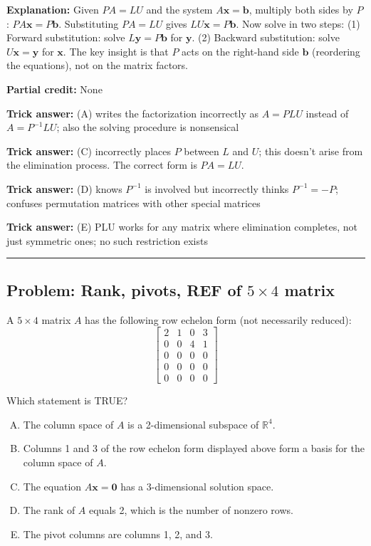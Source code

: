 \documentclass[12pt]{amsart}
\newcommand{\divider}{
  \vspace{-1em}
  \noindent
  \raisebox{-0.15ex}{\textbullet}%
  \hspace{0.5em}%
  \rule[0.5ex]{0.95\textwidth}{1.0pt}%
  \hspace{0.5em}%
  \raisebox{-0.15ex}{\textbullet}%
  \vspace{0em}
}
\begin{document}
\textbf{Explanation:} Given $PA = LU$ and the system $A\mathbf{x} = \mathbf{b}$, multiply both sides by $P$: $PA\mathbf{x} = P\mathbf{b}$. Substituting $PA = LU$ gives $LU\mathbf{x} = P\mathbf{b}$. Now solve in two steps: (1) Forward substitution: solve $L\mathbf{y} = P\mathbf{b}$ for $\mathbf{y}$. (2) Backward substitution: solve $U\mathbf{x} = \mathbf{y}$ for $\mathbf{x}$. The key insight is that $P$ acts on the right-hand side $\mathbf{b}$ (reordering the equations), not on the matrix factors.

\textbf{Partial credit:} None

\textbf{Trick answer:} (A) writes the factorization incorrectly as $A = PLU$ instead of $A = P^{-1}LU$; also the solving procedure is nonsensical

\textbf{Trick answer:} (C) incorrectly places $P$ between $L$ and $U$; this doesn't arise from the elimination process. The correct form is $PA = LU$.

\textbf{Trick answer:} (D) knows $P^{-1}$ is involved but incorrectly thinks $P^{-1} = -P$; confuses permutation matrices with other special matrices

\textbf{Trick answer:} (E) PLU works for any matrix where elimination completes, not just symmetric ones; no such restriction exists

\divider

\subsection*{Problem: Rank, pivots, REF of $5 \times 4$ matrix}

A $5 \times 4$ matrix $A$ has the following row echelon form (not necessarily reduced):
$$\begin{bmatrix} 2 & 1 & 0 & 3 \\ 0 & 0 & 4 & 1 \\ 0 & 0 & 0 & 0 \\ 0 & 0 & 0 & 0 \\ 0 & 0 & 0 & 0 \end{bmatrix}$$

Which statement is TRUE?

\begin{enumerate}[(A)]
\item The column space of $A$ is a 2-dimensional subspace of $\mathbb{R}^4$.
\item Columns 1 and 3 of the row echelon form displayed above form a basis for the column space of $A$.
\item The equation $A\mathbf{x} = \mathbf{0}$ has a 3-dimensional solution space.
\item The rank of $A$ equals 2, which is the number of nonzero rows.
\item The pivot columns are columns 1, 2, and 3.
\end{enumerate}
\end{document}
